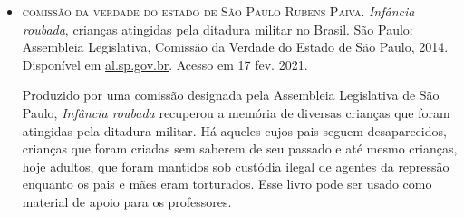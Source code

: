 \documentclass[12pt]{extarticle}
\begin{document}
\begin{itemize}
\item \textsc{comissão da verdade do estado de São Paulo Rubens Paiva.} \emph{Infância
roubada}, crianças atingidas pela ditadura militar no Brasil. São Paulo:
Assembleia Legislativa, Comissão da Verdade do Estado de São Paulo,
2014. Disponível em
\href{https://www.al.sp.gov.br/repositorio/bibliotecaDigital/20800_arquivo.pdf}{{al.sp.gov.br}}.
Acesso em 17 fev. 2021.

Produzido por uma comissão designada pela Assembleia Legislativa de São
Paulo, \emph{Infância roubada} recuperou a memória de diversas crianças
que foram atingidas pela ditadura militar. Há aqueles cujos pais seguem
desaparecidos, crianças que foram criadas sem saberem de seu passado e
até mesmo crianças, hoje adultos, que foram mantidos sob custódia ilegal
de agentes da repressão enquanto os pais e mães eram torturados. Esse
livro pode ser usado como material de apoio para os professores.

\end{itemize}
\end{document}
